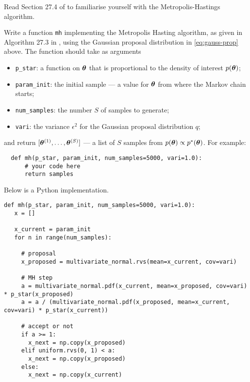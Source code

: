 \begin{exenumerate}
\item Read Section 27.4 of \citet{Barber2012} to familiarise yourself with the Metropolis-Hastings algorithm.

\item\label{qpt:mh} Write a function \lstinline|mh| implementing the
  Metropolis Hasting algorithm, as given in Algorithm 27.3 in
\citet{Barber2012}, using the Gaussian proposal distribution in \eqref{eq:gauss-prop} above. The
  function should take as arguments
\begin{itemize}
	\item \lstinline{p_star}: a function on $\boldsymbol{\theta}$ that is proportional to the density of interest $p(\boldsymbol{\theta})$;
	\item \lstinline{param_init}: the initial sample --- a value for $\boldsymbol{\theta}$ from where the Markov chain starts;
	\item \lstinline{num_samples}: the number $S$ of samples to generate;
	\item \lstinline{vari}: the variance $\epsilon^2$ for the Gaussian proposal distribution $q$;
\end{itemize}
and return $[\boldsymbol{\theta}^{(1)}, \dots, \boldsymbol{\theta}^{(S)}]$ --- a list of $S$ samples from $p(\boldsymbol{\theta}) \propto p^*(\boldsymbol{\theta})$. For example:
\begin{lstlisting}
  def mh(p_star, param_init, num_samples=5000, vari=1.0):
      # your code here
      return samples
\end{lstlisting}



\begin{solution}


  Below is a Python implementation.
\begin{lstlisting}
def mh(p_star, param_init, num_samples=5000, vari=1.0):
   x = []

   x_current = param_init
   for n in range(num_samples):

     # proposal
     x_proposed = multivariate_normal.rvs(mean=x_current, cov=vari)

     # MH step
     a = multivariate_normal.pdf(x_current, mean=x_proposed, cov=vari) * p_star(x_proposed)
     a = a / (multivariate_normal.pdf(x_proposed, mean=x_current, cov=vari) * p_star(x_current))

     # accept or not 
     if a >= 1:
       x_next = np.copy(x_proposed)
     elif uniform.rvs(0, 1) < a:
       x_next = np.copy(x_proposed)
     else:
       x_next = np.copy(x_current)


\end{lstlisting}
\end{solution}
\end{exenumerate}
